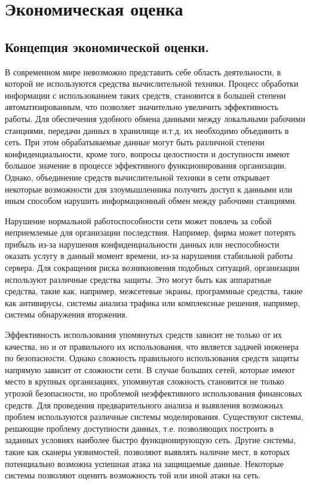 


\section*{Экономическая оценка}
\subsection*{Концепция экономической оценки.}


В современном мире невозможно представить себе область деятельности, в которой не используются средства вычислительной техники. Процесс обработки информации с использованием таких средств, становится в большей степени автоматизированным, что позволяет значительно увеличить эффективность работы. Для обеспечения удобного обмена данными между локальными рабочими станциями, передачи данных в хранилище и.т.д. их необходимо объединить в сеть.  При этом обрабатываемые данные могут быть различной степени конфиденциальности, кроме того, вопросы целостности и доступности имеют большое значение в процессе эффективного функционирования организации. Однако, объединение средств вычислительной техники в сети открывает некоторые возможности для злоумышленника получить доступ к данными или  иным способом нарушить информационный обмен между рабочими станциями.

Нарушение нормальной работоспособности сети может повлечь за собой неприемлемые для организации последствия. Например, фирма может потерять прибыль из-за нарушения конфиденциальности данных или неспособности оказать услугу в данный момент времени, из-за нарушения стабильной работы сервера.
Для сокращения риска возникновения подобных ситуаций, организации используют различные средства защиты. Это могут быть как аппаратные средства, такие как, например,  межсетевые экраны, программные средства, такие как антивирусы, системы анализа трафика или комплексные решения, например, системы обнаружения вторжения.

Эффективность использования упомянутых средств зависит не только от их качества, но и от правильного их использования, что является задачей инженера по безопасности. Однако сложность правильного использования средств защиты напрямую зависит от сложности сети. В случае больших сетей, которые имеют место в крупных организациях, упомянутая сложность становится не только угрозой безопасности, но проблемой неэффективного использования финансовых средств.
Для проведения предварительного анализа и выявления возможных проблем используются различные системы моделирования. Существуют системы, решающие проблему доступности данных, т.е. позволяющих построить в заданных условиях наиболее быстро функционирующую сеть. Другие системы, такие как сканеры уязвимостей, позволяют выявлять наличие мест, в которых потенциально возможна успешная атака на защищаемые данные. Некоторые системы позволяют оценить возможность той или иной атаки на сеть.

